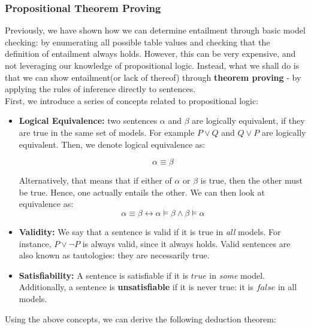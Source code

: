 \documentclass[12pt]{article}
\begin{document}
\subsubsection{Propositional Theorem Proving}

Previously, we have shown how we can determine entailment through basic model checking: by enumerating all possible table values and checking that the definition of entailment always holds. However, this can be very expensive, and not leveraging our knowledge of propositional logic. Instead, what we shall do is that we can show entailment(or lack of thereof) through \textbf{theorem proving} - by applying the rules of inference directly to sentences.\\

First, we introduce a series of concepts related to propositional logic:

\begin{itemize}
\item \textbf{Logical Equivalence:} two sentences $\alpha$ and $\beta$ are logically equivalent, if they are true in the same set of models. For example $P \vee Q$ and $Q \vee P$ are logically equivalent. Then, we denote logical equivalence as:

\begin{equation*}
\alpha \equiv \beta
\end{equation*}

Alternatively, that means that if either of $\alpha$ or $\beta$ is true, then the other must be true. Hence, one actually entails the other. We can then look at equivalence as: 
\begin{equation*}
\alpha \equiv \beta \leftrightarrow \alpha \models \beta \land \beta \models \alpha
\end{equation*}

\item \textbf{Validity:} We say that a sentence is valid if it is true in \textit{all} models. For instance, $P\lor \lnot P$ is always valid, since it always holds. Valid sentences are also known as tautologies: they are necessarily true.

\item \textbf{Satisfiability:} A sentence is satisfiable if it is $true$ in \textit{some} model. Additionally, a sentence is \textbf{unsatisfiable} if it is never true: it is $false$ in all models.
\end{itemize}

Using the above concepts, we can derive the following deduction theorem:
\end{document}
